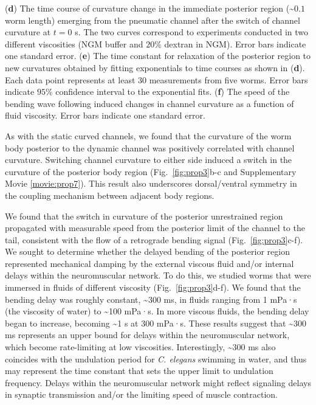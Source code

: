\begin{FPfigure}
{(\textbf{d}) The time course of curvature change in the immediate posterior region (\textasciitilde$0.1$ worm length) 
emerging from the pneumatic channel after the switch of channel curvature at $t = 0$ s. The two 
curves correspond to experiments conducted in two different viscosities (NGM buffer and $20\%$ 
dextran in NGM). Error bars indicate one standard error.  
(\textbf{e}) The time constant for relaxation of the posterior region to new curvatures obtained by fitting 
exponentials to time courses as shown in (\textbf{d}). Each data point represents at least $30$ 
measurements from five worms. Error bars indicate $95\%$ confidence interval to the exponential 
fits.  
(\textbf{f}) The speed of the bending wave following induced changes in channel curvature as a function 
of fluid viscosity. Error bars indicate one standard error.\label{fig:prop3}}
\end{FPfigure}


As with the static curved channels, we found that the curvature of the worm body posterior to the 
dynamic channel was positively correlated with channel curvature. Switching channel curvature 
to either side induced a switch in the curvature of the posterior body region (Fig.~\ref{fig:prop3}b-c and 
Supplementary Movie  \ref{movie:prop7}). This result also underscores dorsal/ventral symmetry in the coupling 
mechanism between adjacent body regions. 

We found that the switch in curvature of the posterior unrestrained region propagated with 
measurable speed from the posterior limit of the channel to the tail, consistent with the flow of a 
retrograde bending signal (Fig.~\ref{fig:prop3}c-f). We sought to determine whether the delayed bending of the 
posterior region represented mechanical damping by the external viscous fluid and/or internal 
delays within the neuromuscular network. To do this, we studied worms that were immersed in 
fluids of different viscosity (Fig.~\ref{fig:prop3}d-f). We found that the bending delay was roughly constant, 
\textasciitilde300 ms, in fluids ranging from 1 mPa·s (the viscosity of water) to \textasciitilde100 mPa·s. In more viscous 
fluids, the bending delay began to increase, becoming \textasciitilde1 s at $300$ mPa·s. These results suggest 
that \textasciitilde300 ms represents an upper bound for delays within the neuromuscular network, which 
become rate-limiting at low viscosities. Interestingly, \textasciitilde300 ms also coincides with the undulation 
period for \textit{C. elegans} swimming in water, and thus may represent the time constant that sets the 
upper limit to undulation frequency. Delays within the neuromuscular network might reflect 
signaling delays in synaptic transmission and/or the limiting speed of muscle contraction.


